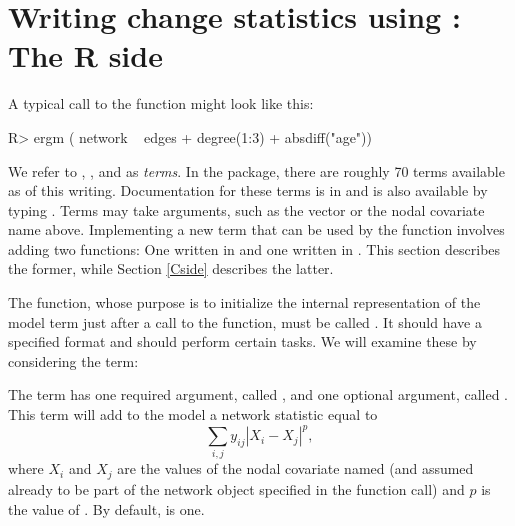 \documentclass[nojss]{jss}
\begin{document}
\section[Writing change statistics using ergm.userterms:  The R side]%
{Writing change statistics using :  The R side}
\label{Rside}

A typical call to the  function might look like this:
\begin{CodeChunk}
\begin{CodeInput}
R> ergm ( network ~ edges + degree(1:3) + absdiff("age"))
\end{CodeInput}
\end{CodeChunk}
We refer to , , and  as {\em terms}.
In the  package, there are roughly 70 terms available
as of this writing.
Documentation for these terms is
 in \citet{ergmtermsjss} and is also available by typing .
 Terms may take arguments, such as the vector  or the nodal covariate
 name  above.  Implementing a new term that can be used by
 the  function involves adding two functions:  One written in 
 and one written in .  This section describes the former, while Section \ref{Cside}
 describes the latter.

The  function, whose purpose is to initialize the internal representation
of the model term  just after a call to the   function,
must be called .  It should have a specified format and should
perform certain tasks.  We will examine these by considering the
 term:
\begin{CodeChunk}
\end{CodeChunk}
The  term has one required argument, called , and
one optional argument, called .  This term will add to the
model a network statistic equal to
\[
\sum_{i,j} y_{ij} |X_i-X_j|^p,
\]
where $X_i$ and $X_j$ are the values of the nodal covariate named 
(and assumed already to be part of the network object specified in the
 function call) and $p$ is the value of .  By default, 
is one.
\end{document}
